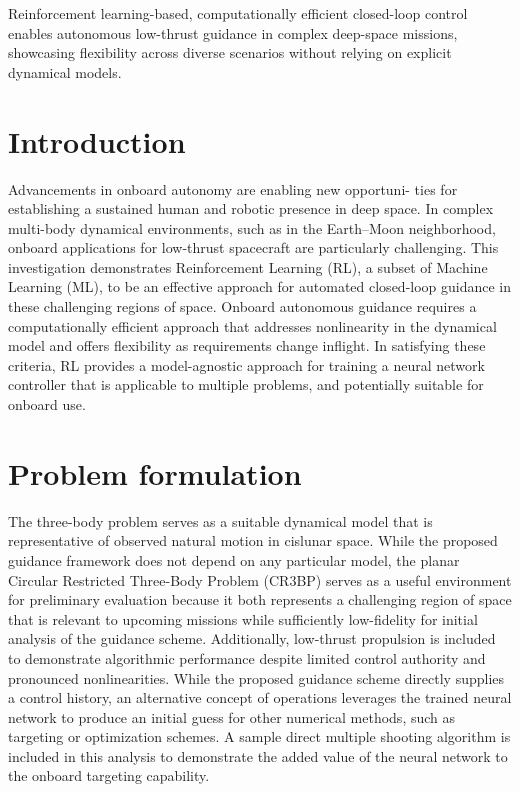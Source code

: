 \documentclass[conference]{IEEEtran}
\begin{document}
\begin{IEEEkeywords}
    Reinforcement learning-based, computationally efficient closed-loop control enables autonomous low-thrust guidance in complex deep-space missions, showcasing flexibility across diverse scenarios without relying on explicit dynamical models.
\end{IEEEkeywords}

\section{Introduction}
Advancements in onboard autonomy are enabling new opportuni- ties for establishing a sustained human and robotic presence in deep space. In complex multi-body dynamical environments, such as in the Earth–Moon neighborhood, onboard applications for low-thrust spacecraft are particularly challenging. This investigation demonstrates Reinforcement Learning (RL), a subset of Machine Learning (ML), to be an effective approach for automated closed-loop guidance in these challenging regions of space. Onboard autonomous guidance requires a computationally efficient approach that addresses nonlinearity in the dynamical model and offers flexibility as requirements change inflight. In satisfying these criteria, RL provides a model-agnostic approach for training a neural network controller that is applicable to multiple problems, and potentially suitable for onboard use.
\section{Problem formulation}
The three-body problem serves as a suitable dynamical model that is representative of observed natural motion in cislunar space. While the proposed guidance framework does not depend on any particular model, the planar Circular Restricted Three-Body Problem (CR3BP) serves as a useful environment for preliminary evaluation because it both represents a challenging region of space that is relevant to upcoming missions while sufficiently low-fidelity for initial analysis of the guidance scheme. Additionally, low-thrust propulsion is included to demonstrate algorithmic performance despite limited control authority and pronounced nonlinearities. While the proposed guidance scheme directly supplies a control history, an alternative concept of operations leverages the trained neural network to produce an initial guess for other numerical methods, such as targeting or optimization schemes. A sample direct multiple shooting algorithm is included in this analysis to demonstrate the added value of the neural network to the onboard targeting capability.
\end{document}
